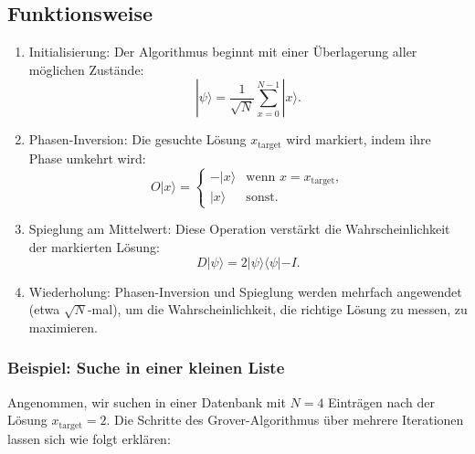 \subsection{Funktionsweise}
\begin{enumerate}
    \item Initialisierung: Der Algorithmus beginnt mit einer Überlagerung aller möglichen Zustände:
        \[
        |\psi\rangle = \frac{1}{\sqrt{N}} \sum_{x=0}^{N-1} |x\rangle.
        \]

    \item Phasen-Inversion: Die gesuchte Lösung $x_{\text{target}}$ wird markiert, indem ihre Phase umkehrt wird:
        \[
        O |x\rangle = \begin{cases} 
            -|x\rangle & \text{wenn } x = x_{\text{target}}, \\
            |x\rangle & \text{sonst}.
        \end{cases}
        \]

    \item Spieglung am Mittelwert: Diese Operation verstärkt die Wahrscheinlichkeit der markierten Lösung:
        \[
        D |\psi\rangle = 2|\psi\rangle\langle\psi| - I.
        \]

    \item Wiederholung: Phasen-Inversion und Spieglung werden mehrfach angewendet (etwa $\sqrt{N}$-mal), um die 
    Wahrscheinlichkeit, die richtige Lösung zu messen, zu maximieren.
\end{enumerate}

\subsubsection{Beispiel: Suche in einer kleinen Liste}
Angenommen, wir suchen in einer Datenbank mit $N=4$ Einträgen nach der Lösung $x_{\text{target}}=2$. Die Schritte des 
Grover-Algorithmus über mehrere Iterationen lassen sich wie folgt erklären:


